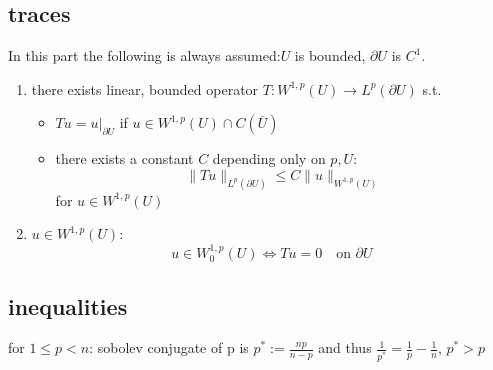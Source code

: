 \subsection{traces}
In this part the following is always assumed:$U$ is bounded, $\partial U$ is $C^1$.

\begin{enumerate}[label = (\alph*)]
	\item there exists linear, bounded operator $T:W^{1,p}(U) \to L^p(\partial U)$ s.t.
	\begin{itemize}
		\item $Tu = u|_{\partial U}$ if $u \in W^{1,p}(U)\cap C(\overline{U})$
		\item  there exists a constant $C$ depending only on $p,U$: \begin{equation*}
			\|Tu\|_{L^p(\partial U)} \leq C \|u\|_{W^{1,p}(U)}
		\end{equation*}
		for $u \in W^{1,p}(U)$
	\end{itemize}

	\item $u \in W^{1,p}(U)$:
	\begin{equation*}
		u \in W^{1,p}_0(U) \iff Tu = 0 \quad \text{on } \partial U
	\end{equation*} 
\end{enumerate}

\subsection{inequalities}
 for $1 \leq p < n$: sobolev conjugate of p is $p^* := \frac{np}{n-p}$ and thus $\frac{1}{p^*} = \frac{1}{p} - \frac{1}{n}$, $p^* > p$
 
